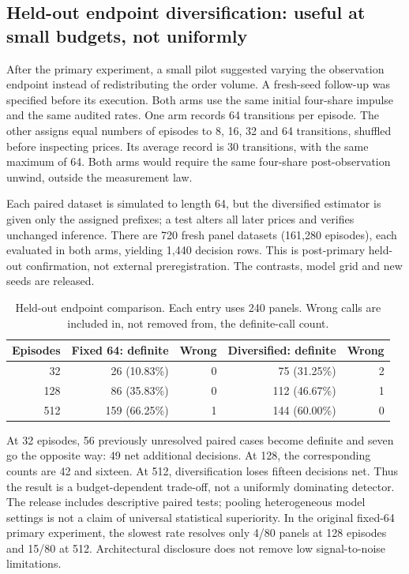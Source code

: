 \subsection{Held-out endpoint diversification: useful at small budgets, not uniformly}
After the primary experiment, a small pilot suggested varying the observation endpoint instead of redistributing the order volume. A fresh-seed follow-up was specified before its execution. Both arms use the same initial four-share impulse and the same audited rates. One arm records 64 transitions per episode. The other assigns equal numbers of episodes to 8, 16, 32 and 64 transitions, shuffled before inspecting prices. Its average record is 30 transitions, with the same maximum of 64. Both arms would require the same four-share post-observation unwind, outside the measurement law.

Each paired dataset is simulated to length 64, but the diversified estimator is given only the assigned prefixes; a test alters all later prices and verifies unchanged inference. There are 720 fresh panel datasets (161,280 episodes), each evaluated in both arms, yielding 1,440 decision rows. This is post-primary held-out confirmation, not external preregistration. The contrasts, model grid and new seeds are released.

\begin{table}[htbp]
\centering\small
\caption{Held-out endpoint comparison. Each entry uses 240 panels. Wrong calls are included in, not removed from, the definite-call count.}
\label{tab:endpoint_results}
\begin{tabular}{r r r r r}
\toprule
Episodes & Fixed 64: definite & Wrong & Diversified: definite & Wrong\\
\midrule
32 & 26 (10.83\%) & 0 & 75 (31.25\%) & 2\\
128 & 86 (35.83\%) & 0 & 112 (46.67\%) & 1\\
512 & 159 (66.25\%) & 1 & 144 (60.00\%) & 0\\
\bottomrule
\end{tabular}
\end{table}

At 32 episodes, 56 previously unresolved paired cases become definite and seven go the opposite way: 49 net additional decisions. At 128, the corresponding counts are 42 and sixteen. At 512, diversification loses fifteen decisions net. Thus the result is a budget-dependent trade-off, not a uniformly dominating detector. The release includes descriptive paired tests; pooling heterogeneous model settings is not a claim of universal statistical superiority. In the original fixed-64 primary experiment, the slowest rate resolves only 4/80 panels at 128 episodes and 15/80 at 512. Architectural disclosure does not remove low signal-to-noise limitations.

